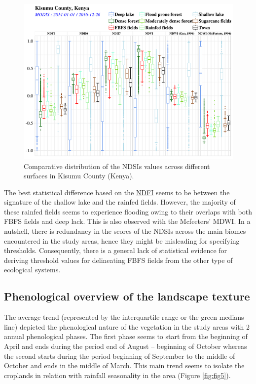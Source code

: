 \documentclass[12pt,oneside]{article}
\begin{document}
\begin{figure}
\includegraphics[width=1\linewidth]{figures/Mapping_FBFS_ndsi_accross_features} \caption{Comparative distribution of the NDSIs values across different surfaces in Kisumu County (Kenya).}\label{fig:fig4}
\end{figure}

The best statistical difference based on the \href{http://journals.plos.org/plosone/article/file?id=10.1371/journal.pone.0088741\&type=printable}{NDFI} seems to be between the signature of the shallow lake and the rainfed fields. However, the majority of these rainfed fields seems to experience flooding owing to their overlaps with both FBFS fields and deep lack. This is also observed with the Mcfeeters' MDWI. In a nutshell, there is redundancy in the scores of the NDSIs across the main biomes encountered in the study areas, hence they might be misleading for specifying thresholds. Consequently, there is a general lack of statistical evidence for deriving threshold values for delineating FBFS fields from the other type of ecological systems.

\hypertarget{II2}{%
\subsection{Phenological overview of the landscape texture}\label{II2}}

The average trend (represented by the interquartile range or the green medians line) depicted the phenological nature of the vegetation in the study areas with 2 annual phenological phases. The first phase seems to start from the beginning of April and ends during the period end of August -- beginning of October whereas the second starts during the period beginning of September to the middle of October and ends in the middle of March. This main trend seems to isolate the croplands in relation with rainfall seasonality in the area (Figure \ref{fig:fig5}).
\end{document}
